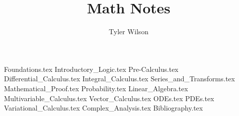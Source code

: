 \documentclass[11pt, fleqn]{article}
\title{Math Notes}
\author{Tyler Wilson}
\date{}
\begin{document}
\allowdisplaybreaks

\maketitle
\tableofcontents

{Foundations.tex}
{Introductory_Logic.tex}
{Pre-Calculus.tex}
{Differential_Calculus.tex}
{Integral_Calculus.tex}
{Series_and_Transforms.tex}
{Mathematical_Proof.tex}
{Probability.tex}
{Linear_Algebra.tex}
{Multivariable_Calculus.tex}
{Vector_Calculus.tex}
{ODEs.tex}
{PDEs.tex}
{Variational_Calculus.tex}
{Complex_Analysis.tex}
{Bibliography.tex}
\end{document}
